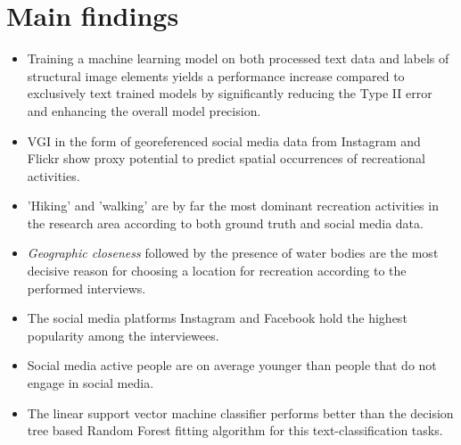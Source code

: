 \section{Main findings}

\begin{itemize}
  \item Training a machine learning model on both processed text data and labels of structural image elements yields a performance increase compared to exclusively text trained models by significantly reducing the Type II error and enhancing the overall model precision.
  \item VGI in the form of georeferenced social media data from Instagram and Flickr show proxy potential to predict spatial occurrences of recreational activities.
  \item 'Hiking' and 'walking' are by far the most dominant recreation activities in the research area according to both ground truth and social media data.
  \item \textit{Geographic closeness} followed by the presence of water bodies are the most decisive reason for choosing a location for recreation according to the performed interviews.
  \item The social media platforms Instagram and Facebook hold the highest popularity among the interviewees.
  \item Social media active people are on average younger than people that do not engage in social media.
  \item The linear support vector machine classifier performs better than the decision tree based Random Forest fitting algorithm for this text-classification tasks. 
\end{itemize}

